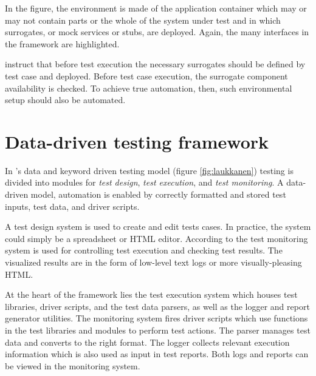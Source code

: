 \documentclass[12pt,a4paper,oneside,pdftex]{report}
\begin{document}
\begin{comment}
\begin{figure}[H]
  \begin{center}
    \texttt{[image: huang\_testing\_process.png]}
    \caption{The testing processes by \citet{huang2008surrogate}}
    \label{fig:huangtesting} 
  \end{center}
\end{figure}
\end{comment}

In the figure, the environment is made of the application container which may or may not contain parts or the whole of the system under test and in which surrogates, or mock services or stubs, are deployed. Again, the many interfaces in the framework are highlighted.

\citet{huang2008surrogate} instruct that before test execution the necessary surrogates should be defined by test case and deployed. Before test case execution, the surrogate component availability is checked. To achieve true automation, then, such environmental setup should also be automated.

\section{Data-driven testing framework}

In \citeauthor{laukkanen2006data}'s \citeyearpar{laukkanen2006data} data and keyword driven testing model (figure \ref{fig:laukkanen}) testing is divided into modules for \emph{test design}, \emph{test execution}, and \emph{test monitoring}. A data-driven model, automation is enabled by correctly formatted and stored test inputs, test data, and driver scripts.

A test design system is used to create and edit tests cases. In practice, the system could simply be a spreadsheet or HTML editor. According to \citet{laukkanen2006data} the test monitoring system is used for controlling test execution and checking test results. The visualized results are in the form of low-level text logs or more visually-pleasing HTML.

At the heart of the framework lies the test execution system which houses test libraries, driver scripts, and the test data parsers, as well as the logger and report generator utilities. The monitoring system fires driver scripts which use functions in the test libraries and modules to perform test actions. The parser manages test data and converts to the right format. The logger collects relevant execution information which is also used as input in test reports. Both logs and reports can be viewed in the monitoring system. \citep{laukkanen2006data}
\end{document}
